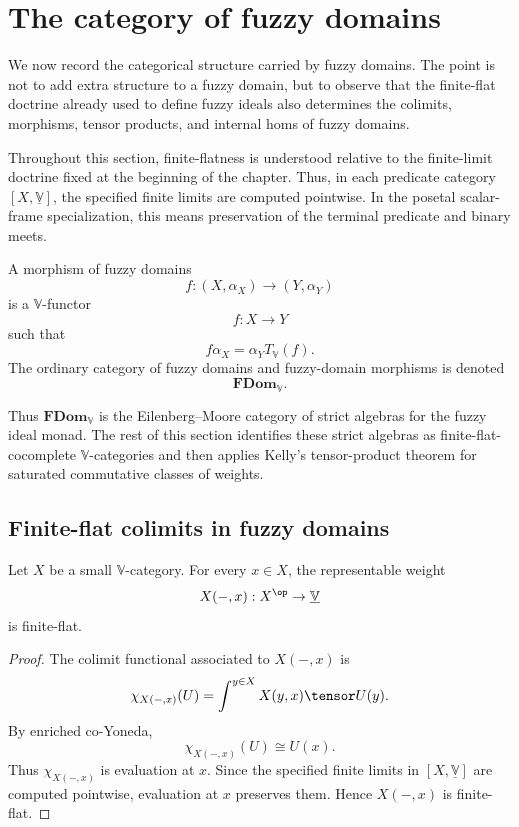 \section{The category of fuzzy domains}
\label{sec:category-fuzzy-domains}

We now record the categorical structure carried by fuzzy domains.  The point is
not to add extra structure to a fuzzy domain, but to observe that the
finite-flat doctrine already used to define fuzzy ideals also determines the
colimits, morphisms, tensor products, and internal homs of fuzzy domains.

Throughout this section, finite-flatness is understood relative to the
finite-limit doctrine fixed at the beginning of the chapter.  Thus, in each
predicate category \([X,\underline{\mathbb V}]\), the specified finite limits are
computed pointwise.  In the posetal scalar-frame specialization, this means
preservation of the terminal predicate and binary meets.

\begin{definition}
\label{def:category-fuzzy-domains}
A morphism of fuzzy domains
\[
    f:(X,\alpha_X)\longrightarrow (Y,\alpha_Y)
\]
is a \(\mathbb V\)-functor
\[
    f:X\to Y
\]
such that
\[
    f\alpha_X=\alpha_YT_{\mathbb V}(f).
\]
The ordinary category of fuzzy domains and fuzzy-domain morphisms is denoted
\[
    \mathbf{FDom}_{\mathbb V}.
\]
\end{definition}

Thus \(\mathbf{FDom}_{\mathbb V}\) is the Eilenberg--Moore category of strict
algebras for the fuzzy ideal monad.  The rest of this section identifies these
strict algebras as finite-flat-cocomplete \(\mathbb V\)-categories and then applies
Kelly's tensor-product theorem for saturated commutative classes of weights.

\subsection{Finite-flat colimits in fuzzy domains}
\label{subsec:finite-flat-colimits-fdom}

\begin{lemma}
\label{lem:representables-finite-flat-fdom}
Let \(X\) be a small \(\mathbb V\)-category.  For every \(x\in X\), the
representable weight
\[
    X(-,x):X^{\op}\to\underline{\mathbb V}
\]
is finite-flat.
\end{lemma}

\begin{proof}
The colimit functional associated to \(X(-,x)\) is
\[
    \chi_{X(-,x)}(U)
    =
    \int^{y\in X}X(y,x)\tensor U(y).
\]
By enriched co-Yoneda,
\[
    \chi_{X(-,x)}(U)\cong U(x).
\]
Thus \(\chi_{X(-,x)}\) is evaluation at \(x\).  Since the specified finite
limits in \([X,\underline{\mathbb V}]\) are computed pointwise, evaluation at
\(x\) preserves them.  Hence \(X(-,x)\) is finite-flat.
\end{proof}

